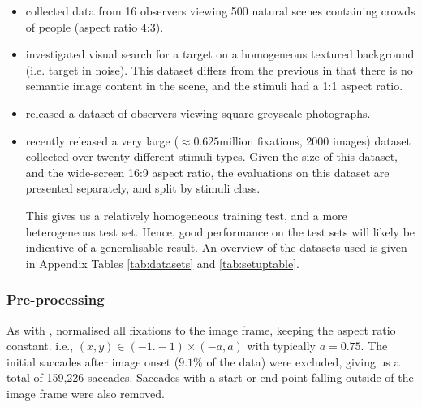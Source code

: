 \begin{itemize}

\item \cite{jiang2014} collected data from 16 observers viewing 500 natural scenes containing crowds of people (aspect ratio 4:3).

\item \cite{clarke2009} investigated visual search for a target on a homogeneous textured background (i.e. target in noise). This dataset differs from the previous in that there is no semantic image content in the scene, and the stimuli had a 1:1 aspect ratio.

\item \cite{greene-wolfe2012} released a dataset of observers viewing square greyscale photographs.

\item \cite{borji2015} recently released a very large ($\approx 0.625$million fixations, 2000 images) dataset collected over twenty different stimuli types. Given the size of this dataset, and the wide-screen 16:9 aspect ratio, the evaluations on this dataset are presented separately, and split by stimuli class.

This gives us a relatively homogeneous training test, and a more heterogeneous test set. Hence, good performance on the test sets will likely be indicative of a generalisable result. An overview of the datasets used is given in Appendix Tables \ref{tab:datasets} and \ref{tab:setuptable}. 

\end{itemize}


\subsubsection{Pre-processing}

As with \cite{clarke-tatler2014}, normalised all fixations to the image frame, keeping the aspect ratio constant. i.e., $(x,y)\in (-1.-1)\times(-a,a)$ with typically $a=0.75$. The initial saccades after image onset ($9.1\%$ of the data) were excluded, giving us a total of 159,226 saccades. Saccades with a start or end point falling outside of the image frame were also removed. 

